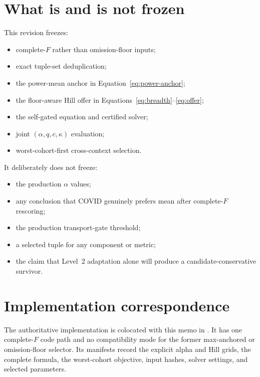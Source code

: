 \documentclass[11pt]{article}
\begin{document}
\section{What is and is not frozen}

This revision freezes:
\begin{itemize}
  \item complete-$F$ rather than omission-floor inputs;
  \item exact tuple-set deduplication;
  \item the power-mean anchor in Equation~\eqref{eq:power-anchor};
  \item the floor-aware Hill offer in Equations~\eqref{eq:breadth}--\eqref{eq:offer};
  \item the self-gated equation and certified solver;
  \item joint $(\alpha,q,c,\kappa)$ evaluation;
  \item worst-cohort-first cross-context selection.
\end{itemize}

It deliberately does not freeze:
\begin{itemize}
  \item the production $\alpha$ values;
  \item any conclusion that COVID genuinely prefers mean after complete-$F$
  rescoring;
  \item the production transport-gate threshold;
  \item a selected tuple for any component or metric;
  \item the claim that Level~2 adaptation alone will produce a
  candidate-conservative survivor.
\end{itemize}

\section{Implementation correspondence}

The authoritative implementation is colocated with this memo in
. It has one
complete-$F$ code path and no compatibility mode for the former max-anchored
or omission-floor selector. Its manifests record the explicit alpha and Hill
grids, the complete formula, the worst-cohort objective, input hashes, solver
settings, and selected parameters.
\end{document}
